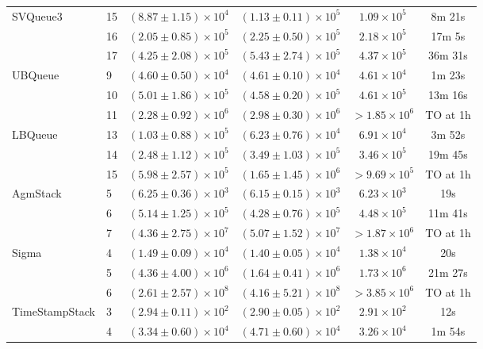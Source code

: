 \begin{table}[tbp]
\begin{tabular}{llcccc}
\midrule
\multirow{3}{*}{SVQueue3}  & 15 & $(8.87 \pm 1.15) \times 10^{4}$ & $(1.13 \pm 0.11) \times 10^{5}$ & $1.09 \times 10^{5}$ & 8m 21s \\
 & 16 & $(2.05 \pm 0.85) \times 10^{5}$ & $(2.25 \pm 0.50) \times 10^{5}$ & $2.18 \times 10^{5}$ & 17m 5s \\
 & 17 & $(4.25 \pm 2.08) \times 10^{5}$ & $(5.43 \pm 2.74) \times 10^{5}$ & $4.37 \times 10^{5}$ & 36m 31s \\
\midrule
\multirow{3}{*}{UBQueue} & 9 & $(4.60 \pm 0.50) \times 10^{4}$ & $(4.61 \pm 0.10) \times 10^{4}$ & $4.61 \times 10^{4}$ & 1m 23s \\
 & 10 & $(5.01 \pm 1.86) \times 10^{5}$ & $(4.58 \pm 0.20) \times 10^{5}$ & $4.61 \times 10^{5}$ & 13m 16s \\
 & 11 & $(2.28 \pm 0.92) \times 10^{6}$ & $(2.98 \pm 0.30) \times 10^{6}$ & $>1.85 \times 10^{6}$ & TO at 1h  \\
 \midrule
 \multirow{3}{*}{LBQueue} & 13 & $(1.03 \pm 0.88) \times 10^{5}$ & $(6.23 \pm 0.76) \times 10^{4}$ & $6.91 \times 10^{4}$ & 3m 52s \\
 & 14 & $(2.48 \pm 1.12) \times 10^{5}$ & $(3.49 \pm 1.03) \times 10^{5}$ & $3.46 \times 10^{5}$ & 19m 45s \\
 & 15 & $(5.98 \pm 2.57) \times 10^{5}$ & $(1.65 \pm 1.45) \times 10^{6}$ & $>9.69 \times 10^{5}$ & TO at 1h  \\
 \midrule
\multirow{3}{*}{AgmStack} & 5 & $(6.25 \pm 0.36) \times 10^{3}$ & $(6.15 \pm 0.15) \times 10^{3}$ & $6.23 \times 10^{3}$ & 19s \\
 & 6 & $(5.14 \pm 1.25) \times 10^{5}$ & $(4.28 \pm 0.76) \times 10^{5}$ & $4.48 \times 10^{5}$ & 11m 41s \\
 & 7 & $(4.36 \pm 2.75) \times 10^{7}$ & $(5.07 \pm 1.52) \times 10^{7}$ & $>1.87 \times 10^{6}$ & TO at 1h  \\
 \midrule
\multirow{3}{*}{Sigma} & 4 & $(1.49 \pm 0.09) \times 10^{4}$ & $(1.40 \pm 0.05) \times 10^{4}$ & $1.38 \times 10^{4}$ & 20s \\
 & 5 & $(4.36 \pm 4.00) \times 10^{6}$ & $(1.64 \pm 0.41) \times 10^{6}$ & $1.73 \times 10^{6}$ & 21m 27s \\
 & 6 & $(2.61 \pm 2.57) \times 10^{8}$ & $(4.16 \pm 5.21) \times 10^{8}$ & $>3.85 \times 10^{6}$ & TO at 1h  \\
 \midrule
\multirow{3}{*}{TimeStampStack} & 3 & $(2.94 \pm 0.11) \times 10^{2}$ & $(2.90 \pm 0.05) \times 10^{2}$ & $2.91 \times 10^{2}$ & 12s \\
 & 4 & $(3.34 \pm 0.60) \times 10^{4}$ & $(4.71 \pm 0.60) \times 10^{4}$ & $3.26 \times 10^{4}$ & 1m 54s \\

\end{tabular}
\end{table}
